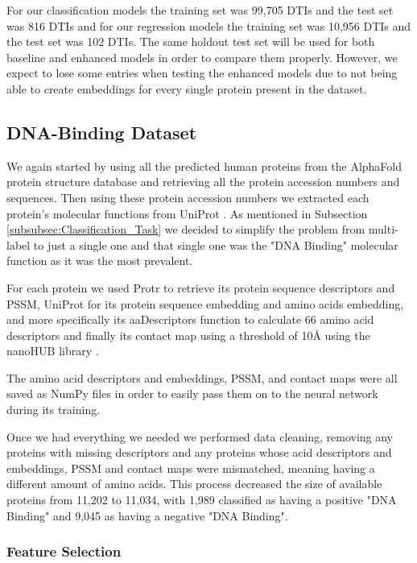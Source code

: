For our classification models the training set was 99,705 DTIs and the test set was 816 DTIs and for our regression models the training set was 10,956 DTIs and the test set was 102 DTIs. The same holdout test set will be used for both baseline and enhanced models in order to compare them properly. However, we expect to lose some entries when testing the enhanced models due to not being able to create embeddings for every single protein present in the dataset.

\subsection{DNA-Binding Dataset}

We again started by using all the predicted human proteins from the AlphaFold protein structure database \citep{Jumper2021, Varadi2022} and retrieving all the protein accession numbers and sequences. Then using these protein accession numbers we extracted each protein's molecular functions from UniProt \citep{UniProt_Paper}. As mentioned in Subsection \ref{subsubsec:Classification_Task} we decided to simplify the problem from multi-label to just a single one and that single one was the "DNA Binding" molecular function as it was the most prevalent.

For each protein we used Protr \citep{ProtR_Paper} to retrieve its protein sequence descriptors and PSSM, UniProt \citep{UniProt_Paper} for its protein sequence embedding and amino acids embedding, \citet{Peptides} and more specifically its aaDescriptors function to calculate 66 amino acid descriptors and finally its contact map using a threshold of 10\AA {} using the nanoHUB library \citep{nanoHUB_Library}.

The amino acid descriptors and embeddings, PSSM, and contact maps were all saved as NumPy files in order to easily pass them on to the neural network during its training.

Once we had everything we needed we performed data cleaning, removing any proteins with missing descriptors and any proteins whose acid descriptors and embeddings, PSSM and contact maps were mismatched, meaning having a different amount of amino acids. This process decreased the size of available proteins from 11,202 to 11,034, with 1,989 classified as having a positive "DNA Binding" and 9,045 as having a negative "DNA Binding".

\subsubsection{Feature Selection}

